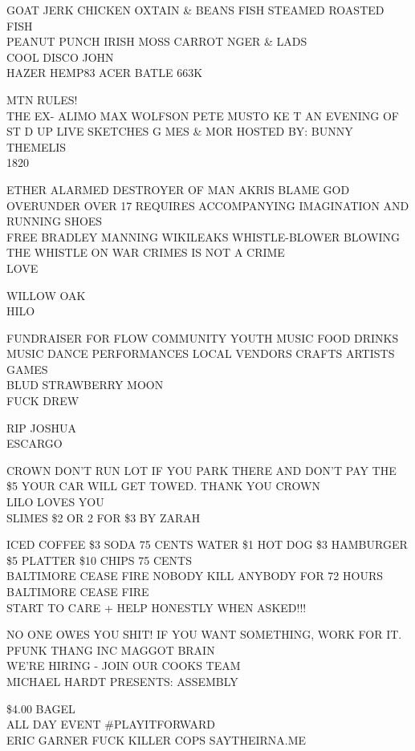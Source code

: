 \documentclass[10pt,letterpaper]{article}
\begin{document}
GOAT JERK CHICKEN OXTAIN \& BEANS FISH STEAMED ROASTED FISH\\
PEANUT PUNCH IRISH MOSS CARROT NGER \& LADS\\
COOL DISCO JOHN\\
HAZER HEMP83 ACER BATLE 663K

MTN RULES!\\
THE EX{-} ALIMO MAX WOLFSON PETE MUSTO KE T AN EVENING OF ST D UP LIVE SKETCHES G MES \& MOR HOSTED BY: BUNNY THEMELIS\\
1820

ETHER ALARMED DESTROYER OF MAN AKRIS BLAME GOD\\
OVERUNDER OVER 17 REQUIRES ACCOMPANYING IMAGINATION AND RUNNING SHOES\\
FREE BRADLEY MANNING WIKILEAKS WHISTLE{-}BLOWER BLOWING THE WHISTLE ON WAR CRIMES IS NOT A CRIME\\
LOVE

WILLOW OAK\\
HILO

FUNDRAISER FOR FLOW COMMUNITY YOUTH MUSIC FOOD DRINKS MUSIC DANCE PERFORMANCES LOCAL VENDORS CRAFTS ARTISTS GAMES\\
BLUD STRAWBERRY MOON\\
FUCK DREW

RIP JOSHUA\\
ESCARGO

CROWN DON'T RUN LOT IF YOU PARK THERE AND DON'T PAY THE \$5 YOUR CAR WILL GET TOWED.  THANK YOU CROWN\\
LILO LOVES YOU\\
SLIMES \$2 OR 2 FOR \$3 BY ZARAH

ICED COFFEE \$3 SODA 75 CENTS WATER \$1 HOT DOG \$3 HAMBURGER \$5 PLATTER \$10 CHIPS 75 CENTS\\
BALTIMORE CEASE FIRE NOBODY KILL ANYBODY FOR 72 HOURS\\
BALTIMORE CEASE FIRE\\
START TO CARE + HELP HONESTLY WHEN ASKED!!!

NO ONE OWES YOU SHIT!  IF YOU WANT SOMETHING, WORK FOR IT.\\
PFUNK THANG INC MAGGOT BRAIN\\
WE'RE HIRING {-} JOIN OUR COOKS TEAM\\
MICHAEL HARDT PRESENTS: ASSEMBLY

\$4.00 BAGEL\\
ALL DAY EVENT \#PLAYITFORWARD\\
ERIC GARNER FUCK KILLER COPS SAYTHEIRNA.ME
\end{document}
